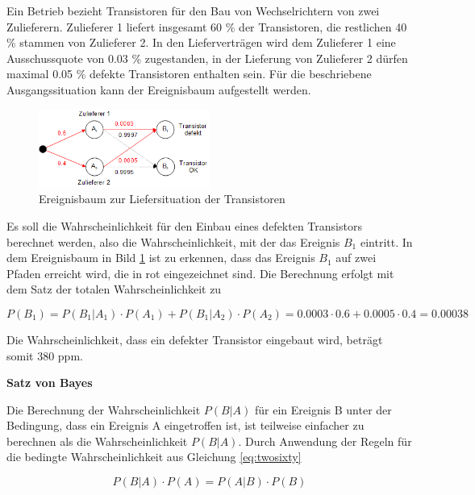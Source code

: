 \noindent Ein Betrieb bezieht Transistoren f\"{u}r den Bau von Wechselrichtern von zwei Zulieferern. Zulieferer 1 liefert insgesamt 60 \% der Transistoren, die restlichen 40 \% stammen von Zulieferer 2. In den Liefervertr\"{a}gen wird dem Zulieferer 1 eine Ausschussquote von 0.03 \% zugestanden, in der Lieferung von Zulieferer 2 d\"{u}rfen maximal 0.05 \% defekte Transistoren enthalten sein. F\"{u}r die beschriebene Ausgangssituation kann der Ereignisbaum aufgestellt werden.

    \noindent 
\begin{figure}[H]
  \centerline{\includegraphics[width=0.5\textwidth]{Kapitel2/Bilder/image12}}
  \caption{Ereignisbaum zur Liefersituation der Transistoren}
  \label{fig:LiefersituationTransistoren}
\end{figure}

\noindent Es soll die Wahrscheinlichkeit f\"{u}r den Einbau eines defekten Transistors berechnet werden, also die Wahrscheinlichkeit, mit der das Ereignis $B_{1}$ eintritt. In dem Ereignisbaum in Bild \ref{fig:LiefersituationTransistoren} ist zu erkennen, dass das Ereignis $B_{1}$ auf zwei Pfaden erreicht wird, die in rot eingezeichnet sind. Die Berechnung erfolgt mit dem Satz der totalen Wahrscheinlichkeit zu

\begin{equation}\label{eq:twoeighty}
P(B_{1})=P(B_{1} |A_{1})\cdot P(A_{1})+P(B_{1} |A_{2})\cdot P(A_{2})=0.0003\cdot 0.6+0.0005\cdot 0.4=0.00038
\end{equation}

\noindent Die Wahrscheinlichkeit, dass ein defekter Transistor eingebaut wird, betr\"{a}gt somit 380 ppm.\bigskip

{\selectfont
\noindent\textbf{Satz von Bayes}} \smallskip

\noindent Die Berechnung der Wahrscheinlichkeit $P(B|A)$ f\"{u}r ein Ereignis B unter der Bedingung, dass ein Ereignis A eingetroffen ist, ist teilweise einfacher zu berechnen als die Wahrscheinlichkeit $P(B|A)$. Durch Anwendung der Regeln f\"{u}r die bedingte Wahrscheinlichkeit aus Gleichung \eqref{eq:twosixty}

\begin{equation}\label{eq:twoeightyone}
P(B|A)\cdot P(A)=P(A|B)\cdot P(B)
\end{equation}

